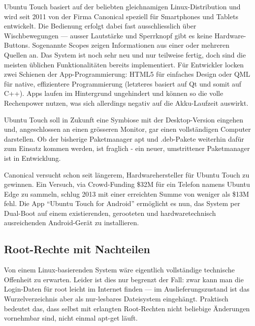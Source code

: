 Ubuntu Touch basiert auf der beliebten gleichnamigen \mbox{Linux-Distribution} und wird seit 2011 von der Firma Canonical speziell für Smartphones und Tablets entwickelt\thinspace\cite{online:ubuntutouch-features}. Die Bedienung erfolgt dabei fast ausschliesslich über Wischbewegungen --- ausser Lautstärke und Sperrknopf gibt es keine Hardware-Buttons\thinspace\cite{online:ubuntutouch-blick}. Sogenannte Scopes zeigen Informationen aus einer oder mehreren Quellen an\thinspace\cite{online:ubuntutouch-scopes}. Das System ist noch sehr neu und nur teilweise fertig, doch sind die meisten üblichen Funktionalitäten bereits implementiert\thinspace\cite{online:ubuntutouch-blick}. Für Entwickler locken zwei Schienen der \mbox{App-Programmierung}: HTML5 für einfaches Design oder QML für native, effizientere Programmierung (letzteres basiert auf Qt und somit auf C++)\thinspace\cite{online:ubuntutouch-developers}. Apps laufen im Hintergrund ungehindert und können so die volle Rechenpower nutzen, was sich allerdings negativ auf die \mbox{Akku-Laufzeit} auswirkt\thinspace\cite{online:ubuntutouch-blick}.

Ubuntu Touch soll in Zukunft eine Symbiose mit der Desktop-Version eingehen und, angeschlossen an einen grösseren Monitor, gar einen vollständigen Computer darstellen\thinspace\cite{online:ubuntutouch-advantages}\thinspace\cite{online:ubuntutouch-edge}. Ob der bisherige Paketmanager apt und .deb-Pakete weiterhin dafür zum Einsatz kommen werden, ist fraglich - ein neuer, umstrittener Paketmanager ist in Entwicklung\thinspace\cite{online:ubuntutouch-snappy}\thinspace\cite{online:ubuntutouch-snappytalk}.

Canonical versucht schon seit längerem, Hardwarehersteller für Ubuntu Touch zu gewinnen. Ein Versuch, via Crowd-Funding \$32M für ein Telefon namens Ubuntu Edge zu sammeln\thinspace\cite{online:ubuntutouch-edge}, schlug 2013 mit einer erreichten Summe von weniger als \$13M fehl\thinspace\cite{online:ubuntutouch-edgefail}. Die App ``Ubuntu Touch for Android'' ermöglicht es nun, das System per \mbox{Dual-Boot} auf einem existierenden, gerooteten und hardwaretechnisch ausreichenden \mbox{Android-Gerät} zu installieren.
\newline

\subsection{Root-Rechte mit Nachteilen}
Von einem Linux-basierenden System wäre eigentlich vollständige technische Offenheit zu erwarten. Leider ist dies nur begrenzt der Fall: zwar kann man die \mbox{Login-Daten} für root leicht im Internet finden --- im Auslieferungszustand ist das Wurzelverzeichnis aber als \mbox{nur-lesbares} Dateisystem eingehängt. Praktisch bedeutet das, dass selbst mit erlangten Root-Rechten nicht beliebige Änderungen vornehmbar sind, nicht einmal \mbox{apt-get} läuft\thinspace\cite{online:ubuntutouch-aptget}.

